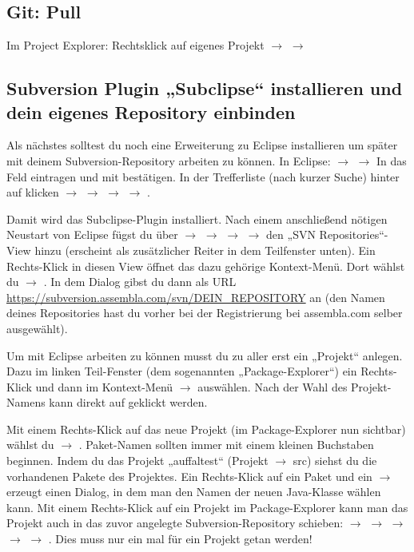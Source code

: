 \subsection{Git: Pull}

Im Project Explorer: Rechtsklick auf eigenes Projekt $\rightarrow$ 
$\rightarrow$ 

\clearpage


\subsection{Subversion Plugin „Subclipse“ installieren und dein eigenes
Repository einbinden} 

Als nächstes solltest du noch eine Erweiterung zu Eclipse installieren um später
mit deinem Sub\-vers\-ion-Repository arbeiten zu können. In Eclipse:
 $\rightarrow$  $\rightarrow$ In
das Feld   eintragen und mit 
bestätigen. In der Trefferliste (nach kurzer Suche) hinter 
auf  klicken $\rightarrow$  $\rightarrow$
 $\rightarrow$  $\rightarrow$
.

Damit wird das Subclipse-Plugin installiert. Nach einem anschließend nötigen
Neustart von Eclipse fügst du über  $\rightarrow$  $\rightarrow$  $\rightarrow$ 
$\rightarrow$  den „SVN Repositories“-View hinzu
(erscheint als zusätzlicher Reiter in dem Teilfenster unten). Ein Rechts-Klick
in diesen View öffnet das dazu gehörige Kontext-Menü. Dort wählst du
 $\rightarrow$ . In dem Dialog
gibst du dann als URL \url{https://subversion.assembla.com/svn/DEIN_REPOSITORY}
an (den Namen deines Repositories hast du vorher bei der Registrierung bei
assembla.com selber ausgewählt).

Um mit Eclipse arbeiten zu können musst du zu aller erst ein „Projekt“ anlegen.
Dazu im linken Teil-Fenster (dem sogenannten „Package-Explorer“) ein
Rechts-Klick und dann im Kontext-Menü  $\rightarrow$  auswählen. Nach der Wahl des Projekt-Namens kann direkt auf
 geklickt werden. 

Mit einem Rechts-Klick auf das neue Projekt (im Package-Explorer nun sichtbar)
wählst du  $\rightarrow$ . Paket-Namen sollten immer
mit einem kleinen Buchstaben beginnen. Indem du das Projekt „auffaltest“
(Projekt $\rightarrow$ src) siehst du die vorhandenen Pakete des Projektes. Ein
Rechts-Klick auf ein Paket und ein  $\rightarrow$ 
erzeugt einen Dialog, in dem man den Namen der neuen Java-Klasse wählen kann.
Mit einem Rechts-Klick auf ein Projekt im Package-Explorer kann man das Projekt
auch in das zuvor angelegte Subversion-Repository schieben: 
$\rightarrow$  $\rightarrow$ 
$\rightarrow$  $\rightarrow$  $\rightarrow$
. Dies muss nur ein mal für ein Projekt getan werden! 

